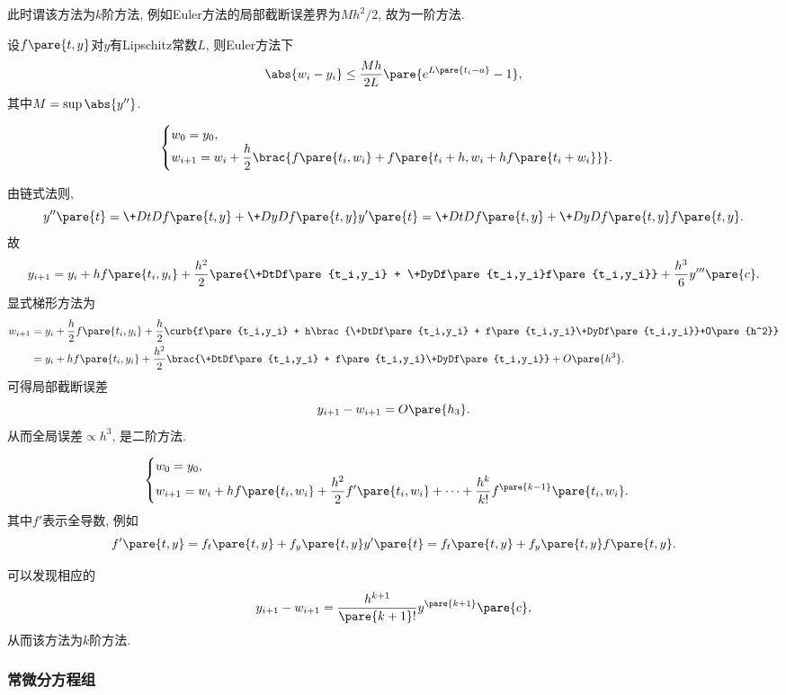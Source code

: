 \documentclass{ctexart}
\begin{document}
此时谓该方法为$k$阶方法, 例如Euler方法的局部截断误差界为$Mh^2/2$, 故为一阶方法.
\begin{corollary}[Euler方法收敛]
    设$f\pare{t,y}$对$y$有Lipschitz常数$L$, 则Euler方法下
    \[ \abs{w_i - y_i} \le \frac{Mh}{2L}\pare{e^{L\pare{t_i-a}} - 1}, \]
    其中$M = \sup \abs{y''}$.
\end{corollary}
\begin{theorem}
    \[ \begin{cases}
        \displaystyle w_0 = y_0,\\
        \displaystyle w_{i+1} = w_i + \frac{h}{2}\brac{f\pare{t_i,w_i} + f\pare{t_i+h,w_i+hf\pare{t_i+w_i}}}.
    \end{cases} \]
\end{theorem}
由链式法则,
\[ y''\pare{t} = \+DtDf\pare{t,y} + \+DyDf\pare{t,y}y'\pare{t} = \+DtDf\pare{t,y} + \+DyDf\pare{t,y}f\pare{t,y}. \]
故
\[ y_{i+1} = y_i + hf\pare{t_i,y_i} + \frac{h^2}{2}\pare{\+DtDf\pare{t_i,y_i} + \+DyDf\pare{t_i,y_i}f\pare{t_i,y_i}} + \frac{h^3}{6}y'''\pare{c}. \]
显式梯形方法为
\begin{align*}
    w_{i+1} &= y_i + \frac{h}{2}f\pare{t_i,y_i} + \frac{h}{2}\curb{f\pare{t_i,y_i} + h\brac{\+DtDf\pare{t_i,y_i} + f\pare{t_i,y_i}\+DyDf\pare{t_i,y_i}}+O\pare{h^2}} \\
    &= y_i + hf\pare{t_i,y_i} + \frac{h^2}{2}\brac{\+DtDf\pare{t_i,y_i} + f\pare{t_i,y_i}\+DyDf\pare{t_i,y_i}} + O\pare{h^3}.
\end{align*}
可得局部截断误差
\[ y_{i+1} - w_{i+1} = O\pare{h_3}. \]
从而全局误差$\propto h^3$, 是二阶方法.
\begin{theorem}[$k$阶Taylor方法]
    \[ \begin{cases}
        \displaystyle w_0 = y_0, \\
        \displaystyle w_{i+1} = w_i + hf\pare{t_i,w_i} + \frac{h^2}{2}f'\pare{t_i,w_i} + \cdots + \frac{h^k}{k!}f^{\pare{k-1}}\pare{t_i,w_i}.
    \end{cases} \]
    其中$f'$表示全导数, 例如
    \[ f'\pare{t,y} = f_t\pare{t,y} + f_y\pare{t,y}y'\pare{t} = f_t\pare{t,y} + f_y\pare{t,y} f\pare{t,y}. \]
\end{theorem}
可以发现相应的
\[ y_{i+1} - w_{i+1} = \frac{h^{k+1}}{\pare{k+1}!}y^{\pare{k+1}}\pare{c}, \]
从而该方法为$k$阶方法.


\subsubsection{常微分方程组} %
\label{ssub:常微分方程组}
\end{document}
